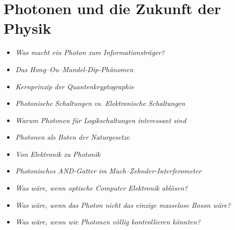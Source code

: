 \section{Photonen und die Zukunft der Physik}
\medskip
\begin{tcolorbox}[title=physikalische Boxen, physikbox]
	\begin{itemize}
		\item \emph{Was macht ein Photon zum Informationsträger?} \dotfill\pageref{box:photon_information}
		\item \emph{Das Hong–Ou–Mandel-Dip-Phänomen} \dotfill\pageref{box:hong_ou_mandel}
		\item \emph{Kernprinzip der Quantenkryptographie} \dotfill\pageref{box:qcrypto_prinzip}
		\item \emph{Photonische Schaltungen vs. Elektronische  Schaltungen} \dotfill\pageref{box:photon_vs_electron}
		\item \emph{Warum Photonen für Logikschaltungen  interessant sind}\dotfill\pageref{box:optlogik_vorteile}
		\item \emph{Photonen als Boten der Naturgesetze} \dotfill\pageref{box:photonen_grundlagen}
	\end{itemize}
\end{tcolorbox}

\medskip
\begin{tcolorbox}[title=didaktische Boxen, didaktikbox]
	\begin{itemize}
		\item \emph{Von Elektronik zu Photonik} \dotfill\pageref{box:optlogik_didaktik}
		\item \emph{Photonisches AND-Gatter im  Mach--Zehnder-Interferometer} \dotfill\pageref{box:mzi_and}
	\end{itemize}
\end{tcolorbox}

\medskip
\begin{tcolorbox}[title=hypothetische Boxen, hypobox]
	\begin{itemize}
		\item \emph{Was wäre, wenn optische Computer  Elektronik ablösen?}\dotfill\pageref{box:optlogik_zukunft}
		\item \emph{Was wäre, wenn das Photon nicht das einzige  masselose Boson wäre?} \dotfill\pageref{box:photon_neue_physik}
		\item \emph{Was wäre, wenn wie Photonen völlig  kontrollieren könnten?} \dotfill\pageref{box:hypo_kapVII}
	\end{itemize}
\end{tcolorbox}

